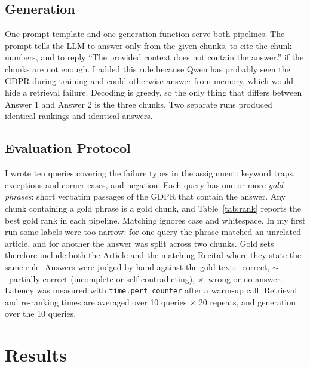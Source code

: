 \documentclass[10pt,a4paper]{article}
\newcommand{\ok}{\textcolor{green!50!black}{\checkmark}}
\newcommand{\no}{\textcolor{red!70!black}{$\times$}}
\newcommand{\pa}{\textcolor{orange!85!black}{$\sim$}}
\begin{document}
\subsection{Generation}
One prompt template and one generation function serve both pipelines. The prompt tells the
LLM to answer only from the given chunks, to cite the chunk numbers, and to reply
``The provided context does not contain the answer.'' if the chunks are not enough. I added
this rule because Qwen has probably seen the GDPR during training and could otherwise answer
from memory, which would hide a retrieval failure. Decoding is greedy, so the only thing
that differs between Answer 1 and Answer 2 is the three chunks. Two separate runs produced
identical rankings and identical answers.

\subsection{Evaluation Protocol}
I wrote ten queries covering the failure types in the assignment: keyword traps, exceptions and
corner cases, and negation. Each query has one or more \emph{gold phrases}: short verbatim
passages of the GDPR that contain the answer. Any chunk containing a gold phrase is a gold
chunk, and Table~\ref{tab:rank} reports the best gold rank in each
pipeline. Matching ignores case and whitespace. In my first run some labels were too narrow:
for one query the phrase matched an unrelated article, and for another the answer was split
across two chunks. Gold sets therefore include both the Article and the matching Recital
where they state the same rule. Answers were judged by hand against the gold text:
\ok\ correct, \pa\ partially correct (incomplete or self-contradicting), \no\ wrong or no answer.
Latency was measured with \texttt{time.perf\_counter} after a warm-up call. Retrieval and
re-ranking times are averaged over 10 queries $\times$ 20 repeats, and generation over the 10 queries.

\section{Results}
\end{document}
